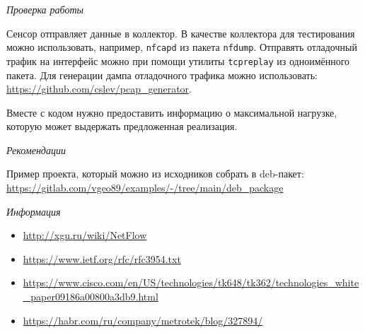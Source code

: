 \newpage

\textit{Проверка работы}

\linespace

Сенсор отправляет данные в коллектор. В качестве коллектора для тестирования можно использовать, например, \verb|nfcapd| из пакета \verb|nfdump|. Отправять отладочный трафик на интерфейс можно при помощи утилиты \verb|tcpreplay| из одноимённого пакета. Для генерации дампа отладочного трафика можно использовать: \url{https://github.com/cslev/pcap_generator}.

\linespace

Вместе с кодом нужно предоставить информацию о максимальной нагрузке, которую может выдержать предложенная реализация.

\linespace

\textit{Рекомендации}

\linespace

Пример проекта, который можно из исходников собрать в deb-пакет:\\
\url{https://gitlab.com/vgeo89/examples/-/tree/main/deb_package}

\linespace

\textit{Информация}

\linespace

\begin{itemize}[wide, noitemsep]
    \item \url{http://xgu.ru/wiki/NetFlow}
    \item \url{https://www.ietf.org/rfc/rfc3954.txt}
    \item \url{https://www.cisco.com/en/US/technologies/tk648/tk362/technologies_white_paper09186a00800a3db9.html}
    \item \url{https://habr.com/ru/company/metrotek/blog/327894/}
\end{itemize}
